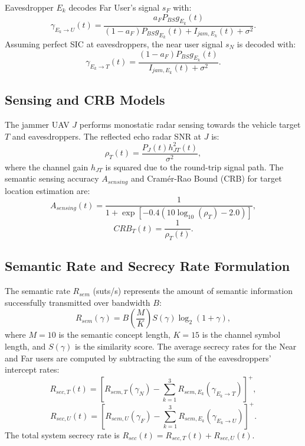 \documentclass[journal,onecolumn]{IEEEtran}
\begin{document}
Eavesdropper $E_k$ decodes Far User's signal $s_F$ with:
\begin{equation}
    \gamma_{E_k \to U}(t) = \frac{a_F P_{BS} g_{E_k}(t)}{(1 - a_F) P_{BS} g_{E_k}(t) + I_{jam, E_k}(t) + \sigma^2}.
\end{equation}
Assuming perfect SIC at eavesdroppers, the near user signal $s_N$ is decoded with:
\begin{equation}
    \gamma_{E_k \to T}(t) = \frac{(1 - a_F) P_{BS} g_{E_k}(t)}{I_{jam, E_k}(t) + \sigma^2}.
\end{equation}

\subsection{Sensing and CRB Models}
The jammer UAV $J$ performs monostatic radar sensing towards the vehicle target $T$ and eavesdroppers. The reflected echo radar SNR at $J$ is:
\begin{equation}
    \rho_T(t) = \frac{P_J(t) h_{JT}^2(t)}{\sigma^2},
\end{equation}
where the channel gain $h_{JT}$ is squared due to the round-trip signal path. The semantic sensing accuracy $A_{sensing}$ and Cram\'{e}r-Rao Bound (CRB) for target location estimation are:
\begin{equation}
    A_{sensing}(t) = \frac{1}{1 + \exp\left[-0.4\left(10\log_{10}(\rho_T) - 2.0\right)\right]},
\end{equation}
\begin{equation}
    CRB_T(t) = \frac{1}{\rho_T(t)}.
\end{equation}

\subsection{Semantic Rate and Secrecy Rate Formulation}
The semantic rate $R_{sem}$ (suts/s) represents the amount of semantic information successfully transmitted over bandwidth $B$:
\begin{equation}
    R_{sem}(\gamma) = B \left(\frac{M}{K}\right) S(\gamma) \log_2(1 + \gamma),
\end{equation}
where $M = 10$ is the semantic concept length, $K = 15$ is the channel symbol length, and $S(\gamma)$ is the similarity score.
The average secrecy rates for the Near and Far users are computed by subtracting the sum of the eavesdroppers' intercept rates:
\begin{equation}
    R_{sec, T}(t) = \left[ R_{sem, T}(\gamma_N) - \sum_{k=1}^3 R_{sem, E_k}(\gamma_{E_k \to T}) \right]^+,
\end{equation}
\begin{equation}
    R_{sec, U}(t) = \left[ R_{sem, U}(\gamma_F) - \sum_{k=1}^3 R_{sem, E_k}(\gamma_{E_k \to U}) \right]^+.
\end{equation}
The total system secrecy rate is $R_{sec}(t) = R_{sec, T}(t) + R_{sec, U}(t)$.
\end{document}
